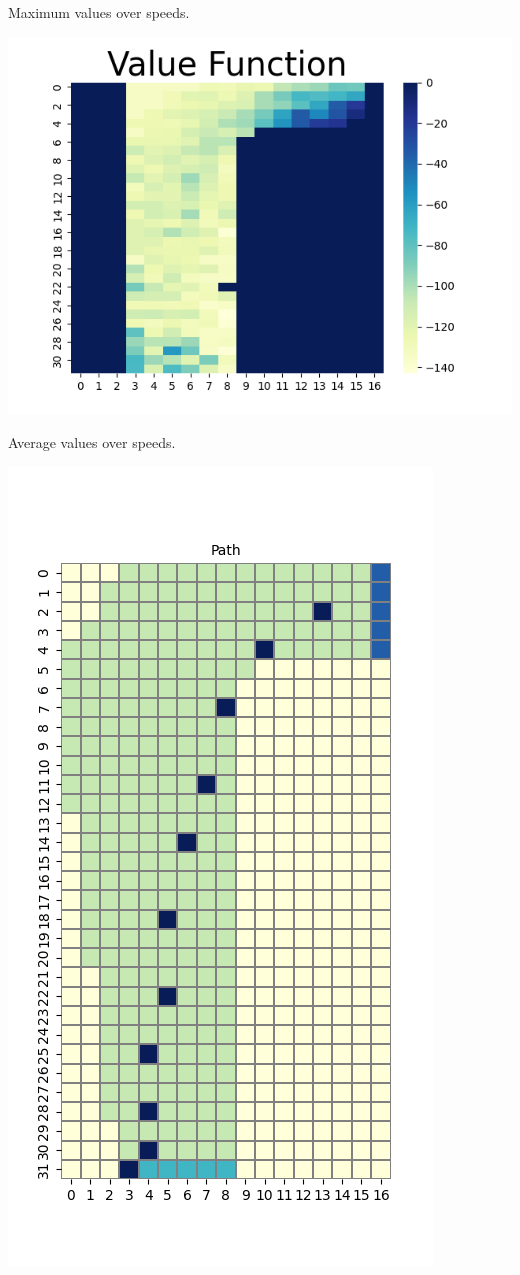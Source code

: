 \documentclass[11pt]{article}
\begin{document}
    Maximum values over speeds.

    \includegraphics[scale=0.7]{env2_5_3_1_avg}

    Average values over speeds.

    \includegraphics[scale=0.7]{env2_demo_e_5_12_3}
\end{document}
